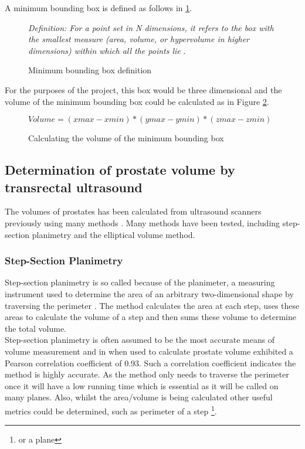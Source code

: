 A minimum bounding box is defined as follows in \ref{fig:bounding_box_definition}.\\

\begin{figure}[h]
\textit{Definition: For a point set in N dimensions, it refers to the box with the smallest measure (area, volume, or hypervolume in higher dimensions) within which all the points lie} \cite{Barequet2001}.
\caption {Minimum bounding box definition}
\label{fig:bounding_box_definition}
\end{figure}

For the purposes of the project, this box would be three dimensional and the volume of the minimum bounding box could be calculated as in Figure \ref{fig:calculating_the_volume_of_the_minimum_bounding_box}.\\

\begin{figure}[h]
\begin{center}
$Volume = (xmax -xmin) * (ymax - ymin) * (zmax - zmin)$
\end{center}
\caption{Calculating the volume of the minimum bounding box}
\label{fig:calculating_the_volume_of_the_minimum_bounding_box}
\end{figure}

\subsection{Determination of prostate volume by transrectal ultrasound}

The volumes of prostates has been calculated from ultrasound scanners previously using many methods \cite{K1991}. 
Many methods have been tested, including step-section planimetry and the elliptical volume method.\\ 

\subsubsection{Step-Section Planimetry}
Step-section planimetry is so called because of the planimeter, a measuring instrument used to determine the area of an arbitrary two-dimensional shape by traversing the perimeter \cite{Bryant2011}. 
The method calculates the area at each step, uses these areas to calculate the volume of a step and then sums these volume to determine the total volume.\\

Step-section planimetry is often assumed to be the most accurate means of volume measurement and in when used to calculate prostate volume \cite{K1991} exhibited a Pearson correlation coefficient of 0.93. 
Such a correlation coefficient indicates the method is highly accurate.
As the method only needs to traverse the perimeter once it will have a low running time which is essential as it will be called on many planes. Also, whilst the area/volume is being calculated other useful metrics could be determined, such as perimeter of a step \footnote{or a plane}.


